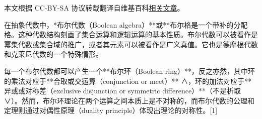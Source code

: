 
本文根据 CC-BY-SA 协议转载翻译自维基百科\href{https://en.wikipedia.org/wiki/Boolean_algebra_(structure)}{相关文章}。

在抽象代数中，*布尔代数（Boolean algebra）**或**布尔格是一个带补的分配格。这种代数结构刻画了集合运算和逻辑运算的基本性质。布尔代数可以被看作是幂集代数或集合域的推广，或者其元素可以被看作是广义真值。它也是德摩根代数和克莱尼代数的一个特殊情形。

每一个布尔代数都可以产生一个**布尔环（Boolean ring）**，反之亦然，其中环的乘法对应于**合取或交运算（conjunction or meet）** ∧，环的加法对应于**异或或对称差（exclusive disjunction or symmetric difference）**（不是析取 ∨）。然而，布尔环理论在两个运算之间本质上是不对称的，而布尔代数的公理和定理则通过\*\*对偶性原理（duality principle）\*\*体现出理论的对称性。[1]
